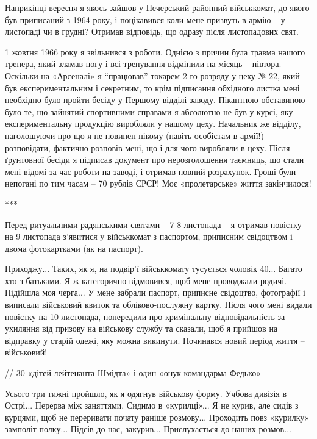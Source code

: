Наприкінці вересня я якось зайшов у Печерський районний військкомат, до якого
був приписаний з 1964 року, і поцікавився коли мене призвуть в армію – у
листопаді чи в грудні? Отримав відповідь, що одразу після листопадових свят.


1 жовтня 1966 року я звільнився з роботи. Однією з причин була травма нашого
тренера, який зламав ногу і всі тренування відмінили на місяць – півтора.
Оскільки на «Арсеналі» я \enquote{працював} токарем 2-го розряду у цеху № 22, який був
експериментальним і секретним, то крім підписання обхідного листка мені
необхідно було пройти бесіду у Першому відділі заводу. Пікантною обставиною
було те, що зайнятий спортивними справами я абсолютно не був у курсі, яку
експериментальну продукцію виробляли у нашому цеху. Начальник же відділу,
наголошуючи про що я не повинен нікому (навіть особістам в армії!) розповідати,
фактично розповів мені, що і для чого виробляли в цеху. Після ґрунтовної бесіди
я підписав документ про нерозголошення таємниць, що стали мені відомі за час
роботи на заводі, і отримав повний розрахунок. Гроші були непогані по тим часам
– 70 рублів СРСР! Моє «пролетарське» життя закінчилося! 

***

Перед ритуальними радянськими святами – 7-8 листопада – я отримав повістку на 9
листопада з’явитися у військкомат з паспортом, приписним свідоцтвом і двома
фотокартками (як на паспорт). 

Приходжу... Таких, як я, на подвір’ї військкомату тусується чоловік 40... Багато
хто з батьками. Я ж категорично відмовився, щоб мене проводжали родичі.
Підійшла моя черга... У мене забрали паспорт, приписне свідоцтво, фотографії і
виписали військовий квиток та обліково-послужну картку. Після чого мені видали
повістку на 10 листопада, попередили про кримінальну відповідальність за
ухиляння від призову на військову службу та сказали, щоб я прийшов на відправку
у старій одежі, яку можна викинути. Починався новий період життя – військовий!

// 30 «дітей лейтенанта Шмідта» і один «онук командарма Федько»

Усього три тижні пройшло, як я одягнув військову форму. Учбова дивізія в Острі...
Перерва між заняттями. Сидимо в «курилці»... Я не курив, але сидів з курцями, щоб
не переривати почату раніше розмову... Проходить повз «курилку» замполіт полку...
Підсів до нас, закурив... Прислухається до наших розмов... 

